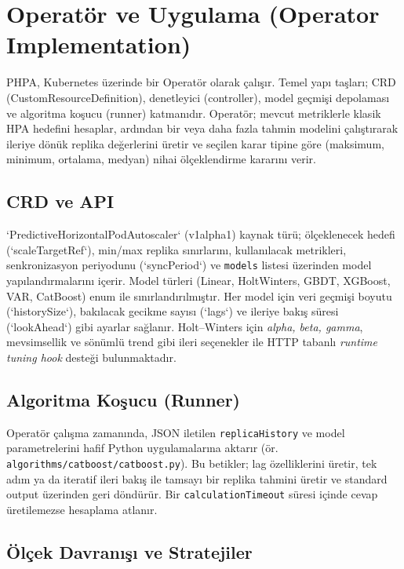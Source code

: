 \section{Operatör ve Uygulama (Operator Implementation)}

PHPA, Kubernetes üzerinde bir Operatör olarak çalışır. Temel yapı taşları; CRD (CustomResourceDefinition), denetleyici (controller), model geçmişi depolaması ve algoritma koşucu (runner) katmanıdır. Operatör; mevcut metriklerle klasik HPA hedefini hesaplar, ardından bir veya daha fazla tahmin modelini çalıştırarak ileriye dönük replika değerlerini üretir ve seçilen karar tipine göre (maksimum, minimum, ortalama, medyan) nihai ölçeklendirme kararını verir.

\subsection{CRD ve API}

`PredictiveHorizontalPodAutoscaler` (v1alpha1) kaynak türü; ölçeklenecek hedefi (`scaleTargetRef`), min/max replika sınırlarını, kullanılacak metrikleri, senkronizasyon periyodunu (`syncPeriod`) ve \texttt{models} listesi üzerinden model yapılandırmalarını içerir. Model türleri (Linear, HoltWinters, GBDT, XGBoost, VAR, CatBoost) enum ile sınırlandırılmıştır. Her model için veri geçmişi boyutu (`historySize`), bakılacak gecikme sayısı (`lags`) ve ileriye bakış süresi (`lookAhead`) gibi ayarlar sağlanır. Holt–Winters için \textit{alpha, beta, gamma}, mevsimsellik ve sönümlü trend gibi ileri seçenekler ile HTTP tabanlı \textit{runtime tuning hook} desteği bulunmaktadır.

\subsection{Algoritma Koşucu (Runner)}

Operatör çalışma zamanında, JSON iletilen \texttt{replicaHistory} ve model parametrelerini hafif Python uygulamalarına aktarır (ör. \texttt{algorithms/catboost/catboost.py}). Bu betikler; lag özelliklerini üretir, tek adım ya da iteratif ileri bakış ile tamsayı bir replika tahmini üretir ve standard output üzerinden geri döndürür. Bir \texttt{calculationTimeout} süresi içinde cevap üretilemezse hesaplama atlanır.

\subsection{Ölçek Davranışı ve Stratejiler}

